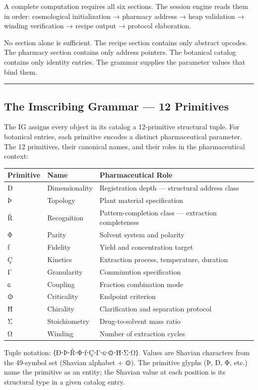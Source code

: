 A complete computation requires all six sections. The session engine
reads them in order: cosmological initialization → pharmacy address →
heap validation → winding verification → recipe output → protocol
elaboration.

No section alone is sufficient. The recipe section contains only
abstract opcodes. The pharmacy section contains only address pointers.
The botanical catalog contains only identity entries. The grammar
supplies the parameter values that bind them.

\begin{center}\rule{0.5\linewidth}{0.5pt}\end{center}

\hypertarget{the-imscribing-grammar-12-primitives}{%
\subsection{The Imscribing Grammar --- 12
Primitives}\label{the-imscribing-grammar-12-primitives}}

The IG assigns every object in its catalog a 12-primitive structural
tuple. For botanical entries, each primitive encodes a distinct
pharmaceutical parameter. The 12 primitives, their canonical names, and
their roles in the pharmaceutical context:

\begin{longtable}[]{@{}lll@{}}
\toprule
Primitive & Name & Pharmaceutical Role\tabularnewline
\midrule
\endhead
Ð & Dimensionality & Registration depth --- structural address
class\tabularnewline
Þ & Topology & Plant material specification\tabularnewline
Ř & Recognition & Pattern-completion class --- extraction
completeness\tabularnewline
Φ & Parity & Solvent system and polarity\tabularnewline
ƒ & Fidelity & Yield and concentration target\tabularnewline
Ç & Kinetics & Extraction process, temperature, duration\tabularnewline
Γ & Granularity & Comminution specification\tabularnewline
ɢ & Coupling & Fraction combination mode\tabularnewline
⊙ & Criticality & Endpoint criterion\tabularnewline
Ħ & Chirality & Clarification and separation protocol\tabularnewline
Σ & Stoichiometry & Drug-to-solvent mass ratio\tabularnewline
Ω & Winding & Number of extraction cycles\tabularnewline
\bottomrule
\end{longtable}

Tuple notation: ⟨Ð⋅Þ⋅Ř⋅Φ⋅ƒ⋅Ç⋅Γ⋅ɢ⋅⊙⋅Ħ⋅Σ⋅Ω⟩. Values are Shavian characters
from the 49-symbol set (Shavian alphabet + ⊙). The primitive glyphs (Þ,
Ð, Φ, etc.) name the primitive as an entity; the Shavian value at each
position is its structural type in a given catalog entry.

